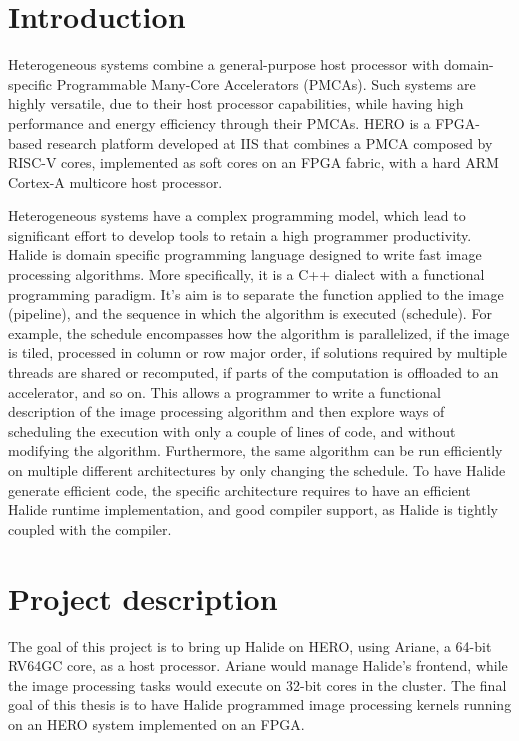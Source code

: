\section{Introduction}

Heterogeneous systems combine a general-purpose host processor with
domain-specific Programmable Many-Core Accelerators (PMCAs). Such
systems are highly versatile, due to their host processor capabilities,
while having high performance and energy efficiency through their PMCAs.
HERO is a FPGA-based research platform developed at IIS that combines a
PMCA composed by RISC-V cores, implemented as soft cores on an FPGA
fabric, with a hard ARM Cortex-A multicore host processor.

Heterogeneous systems have a complex programming model, which lead to
significant effort to develop tools to retain a high programmer
productivity. Halide is domain specific programming language designed to
write fast image processing algorithms. More specifically, it is a C++
dialect with a functional programming paradigm. It's aim is to separate
the function applied to the image (pipeline), and the sequence in which
the algorithm is executed (schedule). For example, the schedule
encompasses how the algorithm is parallelized, if the image is tiled,
processed in column or row major order, if solutions required by
multiple threads are shared or recomputed, if parts of the computation
is offloaded to an accelerator, and so on. This allows a programmer to
write a functional description of the image processing algorithm and
then explore ways of scheduling the execution with only a couple of
lines of code, and without modifying the algorithm. Furthermore, the
same algorithm can be run efficiently on multiple different
architectures by only changing the schedule. To have Halide generate
efficient code, the specific architecture requires to have an efficient
Halide runtime implementation, and good compiler support, as Halide is
tightly coupled with the compiler.

\section{Project description}

The goal of this project is to bring up Halide on HERO, using Ariane, a
64-bit RV64GC core, as a host processor. Ariane would manage Halide's
frontend, while the image processing tasks would execute on 32-bit cores
in the cluster. The final goal of this thesis is to have Halide
programmed image processing kernels running on an HERO system
implemented on an FPGA.

